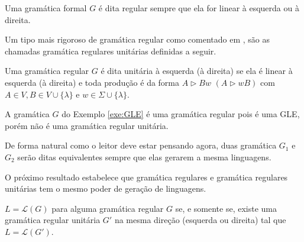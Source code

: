 \begin{definition}
	Uma gramática formal $G$ é dita regular sempre que ela for linear à esquerda ou à direita.
\end{definition}

Um tipo mais rigoroso de gramática regular como comentado em \cite{benjaLivro2010, linz2006},  são as chamadas gramática regulares unitárias definidas a seguir.

\begin{definition}
	Uma gramática regular $G$ é dita unitária à esquerda (à direita) se ela é linear à esquerda (à direita) e toda produção é da forma $A \rhd Bw$ $(A \rhd wB)$ com $A \in V, B \in V \cup \{\lambda\}$ e $w \in \Sigma \cup \{\lambda\}$.
\end{definition}

\begin{example}
	A gramática $G$ do Exemplo \ref{exe:GLE} é uma gramática regular pois é uma GLE, porém não é uma gramática regular unitária.
\end{example}

\begin{remark}
	De forma natural como o leitor deve estar pensando agora,  duas gramática $G_1$ e $G_2$ serão ditas equivalentes sempre que elas gerarem a mesma linguagens.
\end{remark}

O próximo resultado estabelece que gramática regulares e gramática regulares unitárias tem o mesmo poder de geração de linguagens.

\begin{theorem}\label{teo:SimplificacaoRegular}
	$L = \mathcal{L}(G)$ para alguma gramática regular $G$ se, e somente se, existe uma gramática regular unitária $G'$ na mesma direção (esquerda ou direita) tal que $L = \mathcal{L}(G')$.
\end{theorem}

